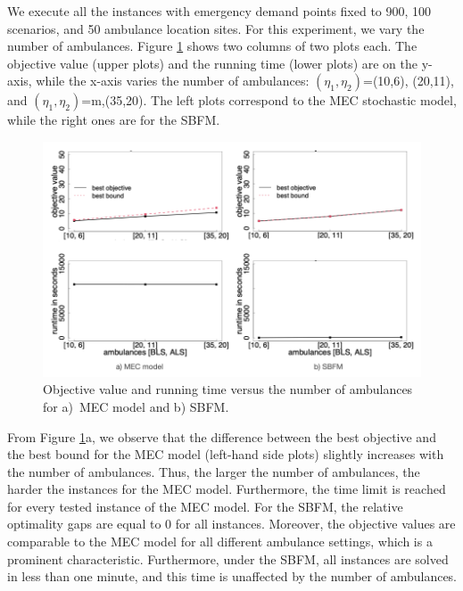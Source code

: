  We execute all the instances with emergency demand points fixed to 900, 100 scenarios, and 50 ambulance location sites. For this experiment, we vary the number of ambulances. Figure \ref{fig:amb} shows two columns of two plots each. The objective value (upper plots) and the running time (lower plots) are on the y-axis, while the x-axis varies the number of ambulances: $(\eta_1,\eta_2)$=(10,6), (20,11), and  $(\eta_1,\eta_2)$=m,(35,20). The left plots correspond to the MEC stochastic model, while the right ones are for the SBFM. 


\begin{figure}[htb]
    \centering
    \includegraphics[width=0.9\linewidth]{AmbComp.png}
    \caption{Objective value and running time versus the number of ambulances for a)~MEC model and b) SBFM.}
    \label{fig:amb}
\end{figure}


From Figure \ref{fig:amb}a, we observe that the difference between the best objective and the best bound for the MEC model (left-hand side plots) slightly increases with the number of ambulances. Thus, the larger the number of ambulances, the harder the instances for the MEC model. Furthermore, the time limit is reached for every tested instance of the MEC model. For the SBFM, the relative optimality gaps are equal to 0 for all instances. Moreover, the objective values are comparable to the MEC model for all different ambulance settings, which is a prominent characteristic. Furthermore, under the SBFM, all instances are solved in less than one minute, and this time is unaffected by the number of ambulances.  

